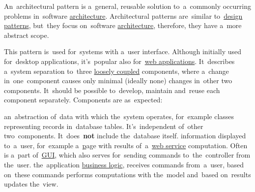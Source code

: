 \label{architecturalpatterns}
An~architectural pattern is a~general, reusable solution to~a~commonly occurring problems in~software \hyperref[architecturedesign]{architecture}.
Architectural patterns are~similar to~\hyperref[designpatterns]{design patterns}, but~they focus on~software \hyperref[architecturedesign]{architecture}, therefore, they have a~more abstract scope.

\label{mvc}
This pattern is~used for~systems with a~user interface.
Although initially used for~desktop applications, it's~popular also for~\hyperref[webserviceapplication]{web applications}.
It~describes a~system separation to~three \hyperref[loosetightcoupling]{loosely coupled} components, where a~change in~one~component causes only minimal (ideally none) changes in~other two components.
It~should be possible to~develop, maintain and~reuse each component separately.
Components are as~expected:
\begin{itemize}
     an~abstraction of~data with which the~system operates, for~example classes representing records in~database tables.
             It's~independent of~other two~components.
          \warningnonl It~does~\textbf{not} include the~database itself.
     information displayed to~a~user, for~example a~\hyperref[web] page with results of~a~\hyperref[webserviceapplication]{web service} computation.
             Often is a~part of~\hyperref[shellcligui]{GUI}, which also serves for~sending commands to~the~controller from the~user.
     the~application \hyperref[businesslogic]{business logic}, receives commands from~a~user, based on~these commands performs computations with the~model and~based on~results updates the~view.
\end{itemize}

